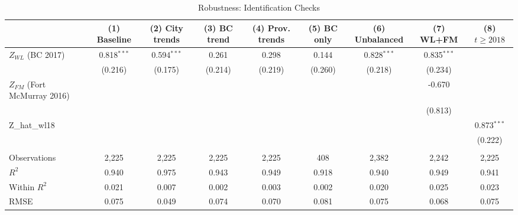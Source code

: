 \begin{table}[htbp]
   \caption{\label{tab:robustness_identification} Robustness: Identification Checks}
   \bigskip
   \centering
   \begin{tabular}{lcccccccc}
      \toprule
                                             & (1) Baseline & (2) City trends & (3) BC trend & (4) Prov. trends & (5) BC only & (6) Unbalanced & (7) WL+FM & (8) $t\geq 2018$ \\  
      \midrule 
      $Z_{WL}$ (BC 2017)                     & 0.818$^{***}$ & 0.594$^{***}$ & 0.261         & 0.298         & 0.144         & 0.828$^{***}$ & 0.835$^{***}$ &   \\   
                                             & (0.216)       & (0.175)       & (0.214)       & (0.219)       & (0.260)       & (0.218)       & (0.234)       &   \\   
      $Z_{FM}$ (Fort McMurray 2016)          &               &               &               &               &               &               & -0.670        &   \\   
                                             &               &               &               &               &               &               & (0.813)       &   \\   
      Z\_hat\_wl18                           &               &               &               &               &               &               &               & 0.873$^{***}$\\   
                                             &               &               &               &               &               &               &               & (0.222)\\   
       \\
      Observations                           & 2,225         & 2,225         & 2,225         & 2,225         & 408           & 2,382         & 2,242         & 2,225\\  
      $R^2$                                  & 0.940         & 0.975         & 0.943         & 0.949         & 0.918         & 0.940         & 0.949         & 0.941\\  
      Within $R^2$                           & 0.021         & 0.007         & 0.002         & 0.003         & 0.002         & 0.020         & 0.025         & 0.023\\  
      RMSE                                   & 0.075         & 0.049         & 0.074         & 0.070         & 0.081         & 0.075         & 0.068         & 0.075\\  

\end{tabular}
\end{table}
